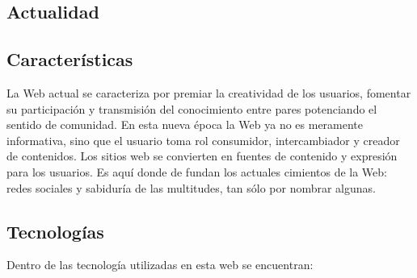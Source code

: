 \subsection{Actualidad}
\subsection{Características}
 
 La Web actual se caracteriza por premiar la creatividad de los usuarios, fomentar su participación y transmisión del conocimiento 
entre pares potenciando el sentido de comunidad. En esta nueva época la Web ya no es meramente informativa, sino que 
el usuario toma rol consumidor, intercambiador y creador de contenidos. Los sitios web se convierten en fuentes de contenido y expresión
para los usuarios. Es aquí donde de fundan los actuales cimientos de la Web: redes sociales y sabiduría de las multitudes, tan sólo por 
nombrar algunas.

\subsection{Tecnologías}
Dentro de las tecnología utilizadas en esta web se encuentran:


